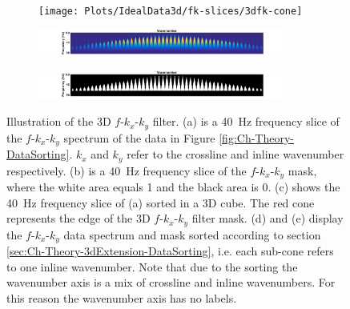 \begin{figure}
\begin{subfigure}[t]{0.3\textwidth}
		\caption{}
		\label{fig:Ch-Theory-FK-f_slice-mask}
	\end{subfigure}
	\centering
	\begin{subfigure}[t]{0.3\textwidth}
		\centering
		\texttt{[image: Plots/IdealData3d/fk-slices/3dfk-cone]}
		\caption{}
		\label{fig:Ch-Theory-FK-f_slice-data3d}
	\end{subfigure}
	
	\begin{subfigure}[t]{\textwidth}
		\centering
		\includegraphics[width=0.9\textwidth]{Plots/IdealData3d/P_fkk_Delphi}
		\caption{}
		\label{fig:Ch-Theory-FK-delphi-data}
	\end{subfigure}
	\par\bigskip
	\begin{subfigure}[t]{\textwidth}
		\centering
		\includegraphics[width=0.9\textwidth]{Plots/IdealData3d/fkk-mask-Delphi}
		\caption{}
		\label{fig:Ch-Theory-FK-delphi-mask}
	\end{subfigure}
	
	\caption{Illustration of the 3D $f$-$k_x$-$k_y$ filter. (a) is a \SI{40}{\hertz} frequency slice of the $f$-$k_x$-$k_y$ spectrum of the data in Figure \ref{fig:Ch-Theory-DataSorting}. $k_x$ and $k_y$ refer to the crossline and inline wavenumber respectively. (b) is a \SI{40}{\hertz} frequency slice of the $f$-$k_x$-$k_y$ mask, where the white area equals 1 and the black area is 0. (c) shows the \SI{40}{\hertz} frequency slice of (a) sorted in a 3D cube. The red cone represents the edge of the 3D $f$-$k_x$-$k_y$ filter mask. (d) and (e) display the $f$-$k_x$-$k_y$ data spectrum and mask sorted according to section \ref{sec:Ch-Theory-3dExtension-DataSorting}, i.e. each sub-cone refers to one inline wavenumber. Note that due to the sorting the wavenumber axis is a mix of crossline and inline wavenumbers. For this reason the wavenumber axis has no labels.}
	\label{fig:Ch-Theory-FKK-Mask}

\end{figure}



